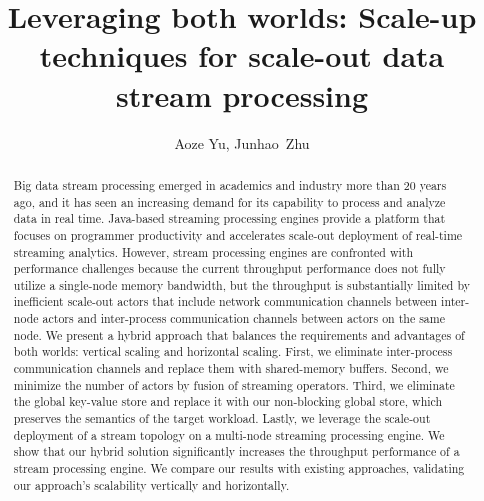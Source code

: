 \documentclass[runningheads]{llncs}
\begin{document}
%
\title{Leveraging both worlds: Scale-up techniques for scale-out data stream
processing}
%
%
\author{Aoze Yu, Junhao~Zhu}
%
\maketitle              %
%
\begin{abstract}
Big data stream processing emerged in academics and industry more than 20 years
ago, and it has seen an increasing demand for its capability to process and
analyze data in real time. Java-based streaming processing engines provide a
platform that focuses on programmer productivity and accelerates scale-out
deployment of real-time streaming analytics. However, stream processing engines
are confronted with performance challenges because the current throughput
performance does not fully utilize a single-node memory bandwidth, but the
throughput is substantially limited by inefficient scale-out actors that
include network communication channels between inter-node actors and
inter-process communication channels between actors on the same node. We
present a hybrid approach that balances the requirements and advantages of both
worlds: vertical scaling and horizontal scaling. First, we eliminate
inter-process communication channels and replace them with shared-memory
buffers. Second, we minimize the number of actors by fusion of streaming
operators. Third, we eliminate the global key-value store and replace it with
our non-blocking global store, which preserves the semantics of the target
workload. Lastly, we leverage the scale-out deployment of a stream topology on
a multi-node streaming processing engine. We show that our hybrid solution
significantly increases the throughput performance of a stream processing
engine. We compare our results with existing approaches, validating our
approach's scalability vertically and horizontally.

\end{abstract}
%
%
%
\end{document}
